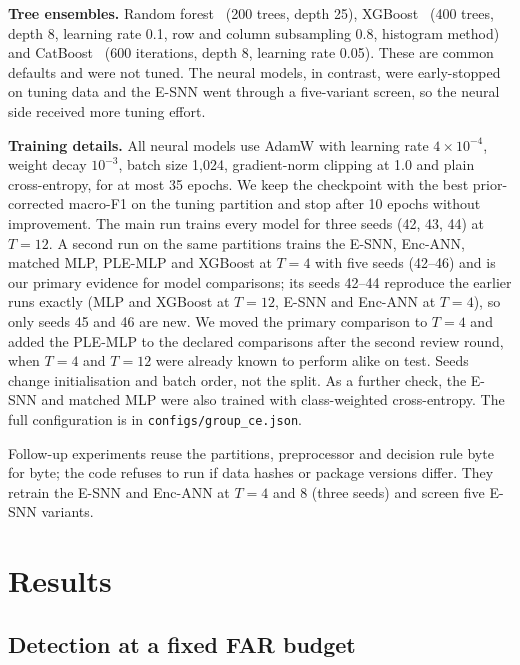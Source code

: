 \documentclass[conference]{IEEEtran}
\begin{document}
\textbf{Tree ensembles.} Random forest~\cite{breiman2001} (200 trees, depth 25), XGBoost~\cite{chen2016} (400 trees, depth 8, learning rate 0.1, row and column subsampling 0.8, histogram method) and CatBoost~\cite{prokhorenkova2018} (600 iterations, depth 8, learning rate 0.05). These are common defaults and were not tuned. The neural models, in contrast, were early-stopped on tuning data and the E-SNN went through a five-variant screen, so the neural side received more tuning effort.

\textbf{Training details.} All neural models use AdamW with learning rate $4\times10^{-4}$, weight decay $10^{-3}$, batch size 1{,}024, gradient-norm clipping at 1.0 and plain cross-entropy, for at most 35 epochs. We keep the checkpoint with the best prior-corrected macro-F1 on the tuning partition and stop after 10 epochs without improvement. The main run trains every model for three seeds (42, 43, 44) at $T = 12$. A second run on the same partitions trains the E-SNN, Enc-ANN, matched MLP, PLE-MLP and XGBoost at $T = 4$ with five seeds (42--46) and is our primary evidence for model comparisons; its seeds 42--44 reproduce the earlier runs exactly (MLP and XGBoost at $T = 12$, E-SNN and Enc-ANN at $T = 4$), so only seeds 45 and 46 are new. We moved the primary comparison to $T = 4$ and added the PLE-MLP to the declared comparisons after the second review round, when $T = 4$ and $T = 12$ were already known to perform alike on test. Seeds change initialisation and batch order, not the split. As a further check, the E-SNN and matched MLP were also trained with class-weighted cross-entropy. The full configuration is in \texttt{configs/group\_ce.json}.

Follow-up experiments reuse the partitions, preprocessor and decision rule byte for byte; the code refuses to run if data hashes or package versions differ. They retrain the E-SNN and Enc-ANN at $T = 4$ and 8 (three seeds) and screen five E-SNN variants.

\section{Results}
\label{sec:results}

\subsection{Detection at a fixed FAR budget}
\end{document}
